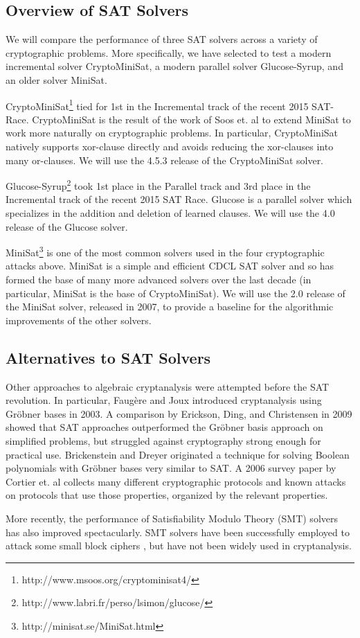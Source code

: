 \subsection{Overview of SAT Solvers}
\label{sec:related:solvers}

We will compare the performance of three SAT solvers across a variety of cryptographic problems. More specifically, we have selected to test a modern incremental solver CryptoMiniSat, a modern parallel solver Glucose-Syrup, and an older solver MiniSat.

CryptoMiniSat\footnote{http://www.msoos.org/cryptominisat4/} tied for 1st in the Incremental track of the recent 2015 SAT-Race. CryptoMiniSat is the result of the work of Soos et. al \cite{SNC09} to extend MiniSat to work more naturally on cryptographic problems.  In particular, CryptoMiniSat natively supports xor-clause directly and avoids reducing the xor-clauses into many or-clauses. We will use the 4.5.3 release of the CryptoMiniSat solver.

Glucose-Syrup\footnote{http://www.labri.fr/perso/lsimon/glucose/} took 1st place in the Parallel track and 3rd place in the Incremental track of the recent 2015 SAT Race. Glucose is a parallel solver which specializes in the addition and deletion of learned clauses. We will use the 4.0 release of the Glucose solver.

MiniSat\footnote{http://minisat.se/MiniSat.html} is one of the most common solvers used in the four cryptographic attacks above. MiniSat is a simple and efficient CDCL SAT solver and so has formed the base of many more advanced solvers over the last decade (in particular, MiniSat is the base of CryptoMiniSat). We will use the 2.0 release of the MiniSat solver, released in 2007, to provide a baseline for the algorithmic improvements of the other solvers.

\subsection{Alternatives to SAT Solvers}
\label{sec:related:otherattacks}
Other approaches to algebraic cryptanalysis were attempted before the SAT revolution. In particular, Faug\`{e}re and Joux \cite{FJ03} introduced cryptanalysis using Gr\"{o}bner bases in 2003. A comparison by Erickson, Ding, and Christensen \cite{EDC09} in 2009 showed that SAT approaches outperformed the Gr\"{o}bner basis approach on simplified problems, but struggled against cryptography strong enough for practical use. Brickenstein and Dreyer \cite{BD09} originated a technique for solving Boolean polynomials with Gr\"{o}bner bases very similar to SAT. A 2006 survey paper by Cortier et. al \cite{CDL06} collects many different cryptographic protocols and known attacks on protocols that use those properties, organized by the relevant properties.

More recently, the performance of Satisfiability Modulo Theory (SMT) solvers has also improved spectacularly. \cite{BDMOS12} SMT solvers have been successfully employed to attack some small block ciphers \cite{Stanek14}, but have not been widely used in cryptanalysis.